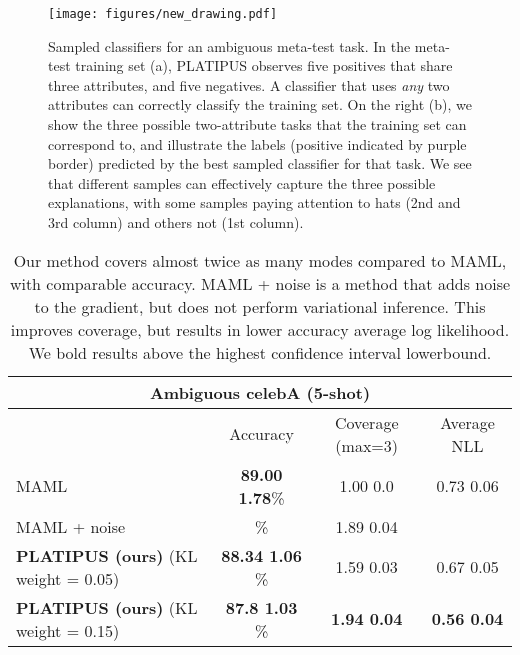 \documentclass{article}
\begin{document}
\begin{figure*}[t] \centering
\texttt{[image: figures/new\_drawing.pdf]}
    \vspace{-0.2cm}
    \caption{\small Sampled classifiers for an ambiguous meta-test task. In the meta-test training set (a), PLATIPUS observes five positives that share three attributes, and five negatives. A classifier that uses \emph{any} two attributes can correctly classify the training set. On the right (b), we show the three possible two-attribute tasks that the training set can correspond to, and illustrate the labels (positive indicated by purple border) predicted by the best sampled classifier for that task. We see that different samples can effectively capture the three possible explanations, with some samples paying attention to hats  (2nd and 3rd column) and others not (1st column).
\label{fig:celeb_a}
    \vspace{-0.1in}
    }
\end{figure*}


\begin{table*}[!h]
\label{tbl:celeba}
\begin{center}
{\footnotesize
\begin{tabular}{|l|c|c|c|}
\hline
\multicolumn{4}{|c|}{Ambiguous celebA (5-shot)} 
\\
\hline
&  Accuracy & Coverage (max=3) & Average NLL \\
\hline
MAML  & \textbf{89.00  1.78}\%  & 1.00  0.0 & 0.73  0.06\\
\hline
MAML + noise &   \%  & 1.89  0.04  &   \\
\hline
\textbf{PLATIPUS (ours)} (KL weight = 0.05)& \textbf{88.34  1.06} \% & 1.59   0.03 & 0.67 0.05 \\
\hline
\textbf{PLATIPUS (ours)} (KL weight = 0.15) & \textbf{87.8  1.03} \% & \textbf{1.94   0.04} & \textbf{0.56  0.04}\\
\hline
\end{tabular}
}
\end{center}
\vspace{-0.35cm}
\caption{ Our method covers almost twice as many modes compared to MAML, with comparable accuracy. 
MAML + noise is a method that adds noise to the gradient, but does not perform variational inference. This improves coverage, but results in lower accuracy average log likelihood. We bold results above the highest confidence interval lowerbound.
}
\vspace{-0.5cm}
\end{table*}
 
\end{document}
